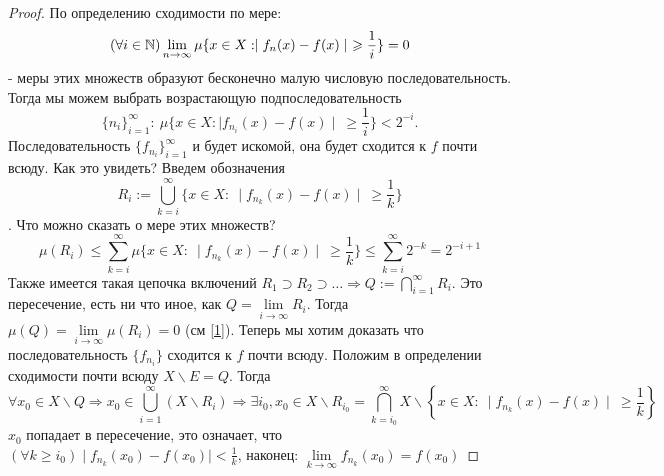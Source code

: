 \begin{proof}
По определению сходимости по мере: $$(\forall i \in \mathbb{N}) \lim_{n\to\infty} \mu \{ x\in X: \mid f_n(x)-f(x)\mid \ \geqslant \frac{1}{i} \} =0$$ - меры этих множеств образуют бесконечно малую числовую последовательность. Тогда мы можем выбрать возрастающую подпоследовательность $$\{n_i\}^\infty_{i=1}:\  \mu \{ x\in X: \mid f_{n_i}(x)-f(x)\mid \ \geqslant \frac{1}{i} \} < 2^{-i}.$$
Последовательность $\{f_{n_i}\}^\infty_{i=1}$ и будет искомой, она будет сходится к $f$ почти всюду. Как это увидеть? Введем обозначения $$R_i:= \bigcup ^\infty_{k=i} \{x\in X:\ \mid f_{n_k}(x)-f(x)\mid \ \geqslant \frac{1}{k}\}$$. Что можно сказать о мере этих множеств?
\begin{equation}\label{1}
    \mu (R_i) \leqslant \sum_{k=i}^{\infty} \mu \{x\in X:\ \mid f_{n_k}(x)-f(x)\mid \ \geqslant \frac{1}{k}\} \leqslant \sum_{k=i}^{\infty} 2^{-k}=2^{-i+1}
\end{equation}
Также имеется такая цепочка включений $R_1\supset R_2 \supset \ldots \Rightarrow Q:=\bigcap\limits_{i=1}^\infty R_i$. Это пересечение, есть ни что иное, как $Q=\lim\limits_{i\to\infty}R_i$. Тогда $\mu(Q)=\lim\limits_{i\to\infty} \mu(R_i)=0$ (см \ref{1}).
\newpage Теперь мы хотим доказать что последовательность $\{f_{n_i}\}$ сходится к $f$ почти всюду. Положим в определении сходимости почти всюду $X\backslash E = Q$.
Тогда $$\forall x_0 \in X\backslash Q \Rightarrow x_0 \in \bigcup^\infty_{i=1}(X\backslash R_i) \Rightarrow \exists i_0, x_0 \in X\backslash R_{i_0} = \bigcap^\infty_{k=i_0} X\backslash \left\{x\in X:\ \mid f_{n_k}(x)-f(x)\mid \ \geqslant \frac{1}{k}\right\}$$
$x_0$ попадает в пересечение, это означает, что $(\forall k \geqslant i_0) \mid f_{n_k}(x_0)-f(x_0)\mid < \frac{1}{k}$, наконец: ${\lim\limits_{k\to\infty}f_{n_k}(x_0)=f(x_0)}$
\end{proof}

